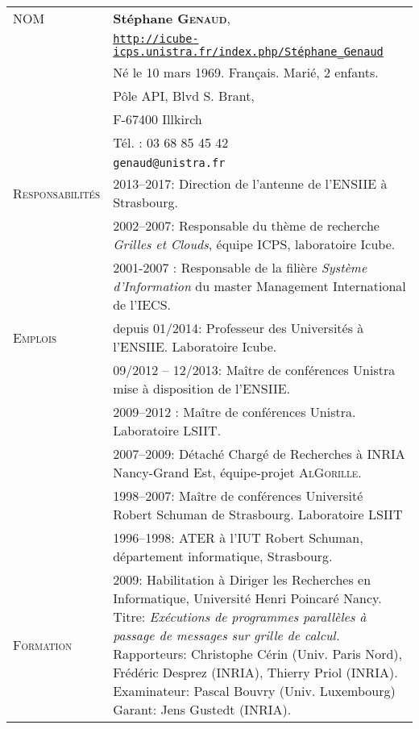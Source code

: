 \setlength{\tabcolsep}{5pt}
\noindent
\begin{tabular}{lp{13.7cm}}
\textsc{NOM}		&{\bf Stéphane \textsc{Genaud}}, \\
			& \texttt{\url{http://icube-icps.unistra.fr/index.php/Stéphane\_Genaud}}\\
			& Né le 10 mars 1969. Français. Marié, 2 enfants. \\
			& Pôle API, Blvd S. Brant,\\
			& F-67400 Illkirch\\
			& Tél. : 03 68 85 45 42\\ 
			& \texttt{genaud@unistra.fr}\\[5mm]
\hline
\textsc{Responsabilités}& 2013--2017: Direction de l'antenne de l'ENSIIE à Strasbourg.\\[2mm]
			& 2002--2007: Responsable du thème de recherche \textit{Grilles et Clouds}, équipe ICPS, laboratoire Icube.\\[2mm]
			& 2001-2007 : Responsable de la filière \textit{Système d'Information} du master Management International de l'IECS.\\[2mm]
\hline
\textsc{Emplois} 	& depuis 01/2014: Professeur des Universités à l'ENSIIE. Laboratoire Icube.\\
			& 09/2012 -- 12/2013: Maître de conférences Unistra mise à disposition de l'ENSIIE.\\[2mm]
			& 2009--2012 : Maître de conférences Unistra. Laboratoire LSIIT.\\[2mm]
 	                & 2007--2009: Détaché Chargé de Recherches à INRIA
                          Nancy-Grand Est, équipe-projet \textsc{AlGorille}.\\[2mm]
			& 1998--2007: Maître de conférences Université Robert Schuman de Strasbourg. Laboratoire LSIIT\\[2mm]
			& 1996--1998: ATER à l'IUT Robert Schuman, département informatique, Strasbourg.\\[2mm]
\hline
\textsc{Formation}	& 2009:  Habilitation à Diriger les Recherches en Informatique, Université Henri Poincaré Nancy.
      			  Titre: {\em Exécutions de programmes parallèles à passage de messages sur grille de calcul.}
   				 Rapporteurs: 	Christophe Cérin (Univ. Paris Nord), 
				   		   	Frédéric Desprez (INRIA),
							Thierry Priol (INRIA). 
							Examinateur: Pascal Bouvry (Univ. Luxembourg)
							Garant: Jens Gustedt (INRIA).\\[5mm]

\end{tabular}
